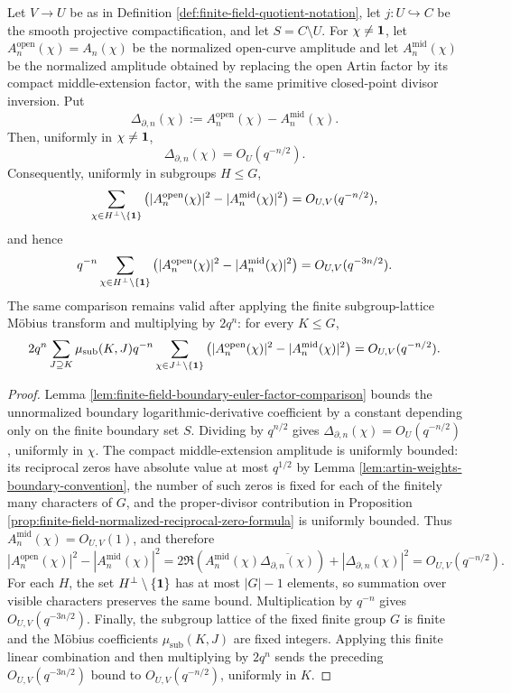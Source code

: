 \begin{lemma}\label{lem:finite-field-visible-energy-boundary-stability}
Let \(V\to U\) be as in Definition \ref{def:finite-field-quotient-notation}, let \(j:U\hookrightarrow C\) be the smooth projective compactification, and let \(S=C\setminus U\).  For \(\chi\ne\mathbf{1}\), let \(A_n^{\mathrm{open}}(\chi)=A_n(\chi)\) be the normalized open-curve amplitude and let \(A_n^{\mathrm{mid}}(\chi)\) be the normalized amplitude obtained by replacing the open Artin factor by its compact middle-extension factor, with the same primitive closed-point divisor inversion.  Put
\[
\Delta_{\partial,n}(\chi):=A_n^{\mathrm{open}}(\chi)-A_n^{\mathrm{mid}}(\chi).
\]
Then, uniformly in \(\chi\ne\mathbf{1}\),
\[
\Delta_{\partial,n}(\chi)=O_U(q^{-n/2}).
\]
Consequently, uniformly in subgroups \(H\le G\),
\[
\sum_{\chi\in H^\perp\setminus\{\mathbf{1}\}}
\left(
|A_n^{\mathrm{open}}(\chi)|^2-|A_n^{\mathrm{mid}}(\chi)|^2
\right)=O_{U,V}(q^{-n/2}),
\]
and hence
\[
q^{-n}
\sum_{\chi\in H^\perp\setminus\{\mathbf{1}\}}
\left(
|A_n^{\mathrm{open}}(\chi)|^2-|A_n^{\mathrm{mid}}(\chi)|^2
\right)=O_{U,V}(q^{-3n/2}).
\]
The same comparison remains valid after applying the finite subgroup-lattice M\"obius transform and multiplying by \(2q^n\): for every \(K\le G\),
\[
2q^n\sum_{J\supseteq K}\mu_{\mathrm{sub}}(K,J)q^{-n}
\sum_{\chi\in J^\perp\setminus\{\mathbf{1}\}}
\left(
|A_n^{\mathrm{open}}(\chi)|^2-|A_n^{\mathrm{mid}}(\chi)|^2
\right)=O_{U,V}(q^{-n/2}).
\]
\end{lemma}

\begin{proof}
Lemma \ref{lem:finite-field-boundary-euler-factor-comparison} bounds the unnormalized boundary logarithmic-derivative coefficient by a constant depending only on the finite boundary set \(S\).  Dividing by \(q^{n/2}\) gives
\(\Delta_{\partial,n}(\chi)=O_U(q^{-n/2})\), uniformly in \(\chi\).  The compact middle-extension amplitude is uniformly bounded: its reciprocal zeros have absolute value at most \(q^{1/2}\) by Lemma \ref{lem:artin-weights-boundary-convention}, the number of such zeros is fixed for each of the finitely many characters of \(G\), and the proper-divisor contribution in Proposition \ref{prop:finite-field-normalized-reciprocal-zero-formula} is uniformly bounded.  Thus \(A_n^{\mathrm{mid}}(\chi)=O_{U,V}(1)\), and therefore
\[
|A_n^{\mathrm{open}}(\chi)|^2-|A_n^{\mathrm{mid}}(\chi)|^2
=2\Re\!\left(A_n^{\mathrm{mid}}(\chi)\overline{\Delta_{\partial,n}(\chi)}\right)
+|\Delta_{\partial,n}(\chi)|^2
=O_{U,V}(q^{-n/2}).
\]
For each \(H\), the set \(H^\perp\setminus\{\mathbf{1}\}\) has at most \(|G|-1\) elements, so summation over visible characters preserves the same bound.  Multiplication by \(q^{-n}\) gives \(O_{U,V}(q^{-3n/2})\).  Finally, the subgroup lattice of the fixed finite group \(G\) is finite and the M\"obius coefficients \(\mu_{\mathrm{sub}}(K,J)\) are fixed integers.  Applying this finite linear combination and then multiplying by \(2q^n\) sends the preceding \(O_{U,V}(q^{-3n/2})\) bound to \(O_{U,V}(q^{-n/2})\), uniformly in \(K\).
\end{proof}

